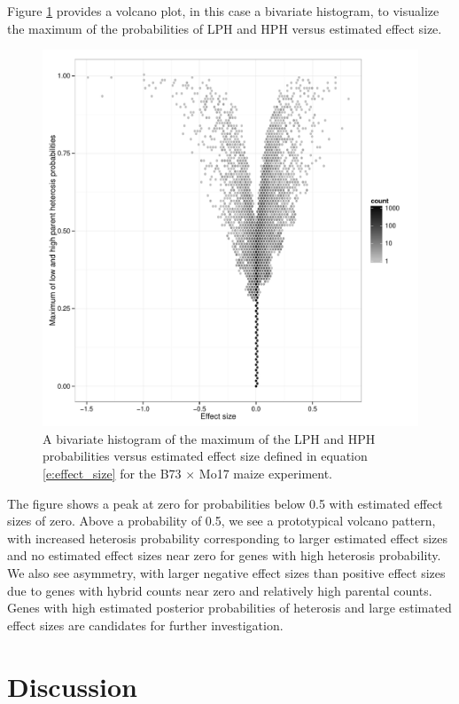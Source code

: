 \documentclass[useAMS,usenatbib,referee]{biom}
\begin{document}
Figure \ref{f:volcano} provides a volcano plot, in this case a bivariate histogram, to visualize the maximum of the probabilities of LPH and HPH versus estimated effect size. 
\begin{figure}
\centerline{\includegraphics[width=\textwidth]{volcano}}
\caption{A bivariate histogram of the maximum of the LPH and HPH probabilities versus estimated effect size defined in equation \eqref{e:effect_size} for the B73 $\times$ Mo17 maize experiment.}
\label{f:volcano}
\end{figure}
The figure shows a peak at zero for probabilities below 0.5 with estimated effect sizes of zero. Above a probability of 0.5, we see a prototypical volcano pattern, with increased heterosis probability corresponding to larger estimated effect sizes and no estimated effect sizes near zero for genes with high heterosis probability. We also see asymmetry, with larger negative effect sizes than positive effect sizes due to genes with hybrid counts near zero and relatively high parental counts. Genes with high estimated posterior probabilities of heterosis and large estimated effect sizes are candidates for further investigation.






\section{Discussion}
\label{s:discussion}
\end{document}
